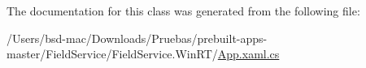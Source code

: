 The documentation for this class was generated from the following file\+:\begin{DoxyCompactItemize}
\item 
/\+Users/bsd-\/mac/\+Downloads/\+Pruebas/prebuilt-\/apps-\/master/\+Field\+Service/\+Field\+Service.\+Win\+R\+T/\hyperlink{_field_service_8_win_r_t_2_app_8xaml_8cs}{App.\+xaml.\+cs}\end{DoxyCompactItemize}
